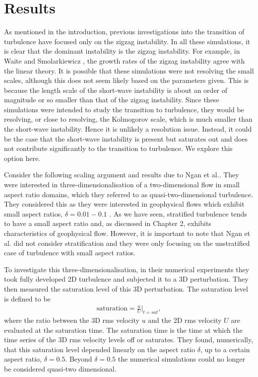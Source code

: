 \section{Results}
As mentioned in the introduction, previous investigations into the transition of turbulence have focused only on the zigzag instability. In all these simulations, it is clear that the dominant instability is the zigzag instability. For example, in Waite and Smolarkiewicz \cite{waitesmol2008}, the growth rates of the zigzag instability agree with the linear theory. It is possible that these simulations were not resolving the small scales, although this does not seem likely based on the parameters given. This is because the length scale of the short-wave instability is about an order of magnitude or so smaller than that of the zigzag instability. Since these simulations were intended to study the transition to turbulence, they would be resolving, or close to resolving, the Kolmogorov scale, which is much smaller than the short-wave instability. Hence it is unlikely a resolution issue. Instead, it could be the case that the short-wave instability is present but saturates out and does not contribute significantly to the transition to turbulence. We explore this option here. 

Consider the following scaling argument and results due to Ngan et al.\cite{ngan2005}. They were interested in three-dimensionalisation of a two-dimensional flow in small aspect ratio domains, which they referred to as quasi-two-dimensional turbulence. They considered this as they were interested in geophysical flows which exhibit small aspect ratios, $\delta=0.01-0.1$ \cite{ngan2005}. As we have seen, stratified turbulence tends to have a small aspect ratio and, as discussed in Chapter 2, exhibits characteristics of geophysical flow. However, it is important to note that Ngan et al.\cite{ngan2005} did not consider stratification and they were only focusing on the unstratified case of turbulence with small aspect ratios. 

To investigate this three-dimensionalisation, in their numerical experiments they took fully developed 2D turbulence and subjected it to a 3D perturbation. They then measured the saturation level of this 3D perturbation. The saturation level is defined to be
\begin{align}
\text{saturation} = \frac{u}{U}\bigg|_{t=sat}, \label{ngan_scale}
\end{align}
where the ratio between the 3D rms velocity $u$ and the 2D rms velocity $U$ are evaluated at the saturation time. The saturation time is the time at which the time series of the 3D rms velocity levels off or saturates. They found, numerically, that this saturation level depended linearly on the aspect ratio $\delta$, up to a certain aspect ratio, $\delta=0.5$. Beyond $\delta=0.5$ the numerical simulations could no longer be considered quasi-two dimensional. 

